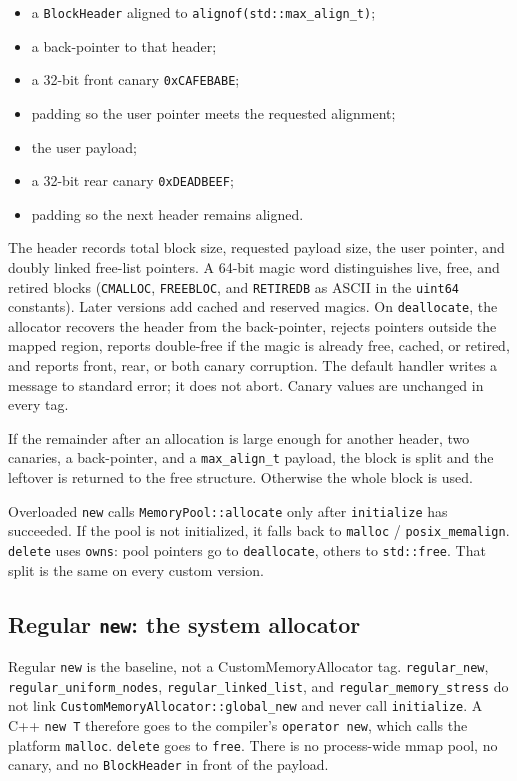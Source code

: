 \begin{itemize}
  \item a \texttt{BlockHeader} aligned to \texttt{alignof(std::max\_align\_t)};
  \item a back-pointer to that header;
  \item a 32-bit front canary \texttt{0xCAFEBABE};
  \item padding so the user pointer meets the requested alignment;
  \item the user payload;
  \item a 32-bit rear canary \texttt{0xDEADBEEF};
  \item padding so the next header remains aligned.
\end{itemize}

The header records total block size, requested payload size, the user pointer,
and doubly linked free-list pointers.
A 64-bit magic word distinguishes live, free, and retired blocks
(\texttt{CMALLOC}, \texttt{FREEBLOC}, and \texttt{RETIREDB} as ASCII in the
\texttt{uint64} constants).
Later versions add cached and reserved magics.
On \texttt{deallocate}, the allocator recovers the header from the back-pointer,
rejects pointers outside the mapped region, reports double-free if the magic is
already free, cached, or retired, and reports front, rear, or both canary
corruption.
The default handler writes a message to standard error; it does not abort.
Canary values are unchanged in every tag.

If the remainder after an allocation is large enough for another header, two
canaries, a back-pointer, and a \texttt{max\_align\_t} payload, the block is
split and the leftover is returned to the free structure.
Otherwise the whole block is used.

Overloaded \texttt{new} calls \texttt{MemoryPool::allocate} only after
\texttt{initialize} has succeeded.
If the pool is not initialized, it falls back to \texttt{malloc} /
\texttt{posix\_memalign}.
\texttt{delete} uses \texttt{owns}: pool pointers go to
\texttt{deallocate}, others to \texttt{std::free}.
That split is the same on every custom version.

\subsection{Regular \texttt{new}: the system allocator}

Regular \texttt{new} is the baseline, not a CustomMemoryAllocator tag.
\texttt{regular\_new}, \texttt{regular\_uniform\_nodes},
\texttt{regular\_linked\_list}, and \texttt{regular\_memory\_stress} do not
link \texttt{CustomMemoryAllocator::global\_new} and never call
\texttt{initialize}.
A C++ \texttt{new T} therefore goes to the compiler's \texttt{operator new},
which calls the platform \texttt{malloc}.
\texttt{delete} goes to \texttt{free}.
There is no process-wide mmap pool, no canary, and no
\texttt{BlockHeader} in front of the payload.

